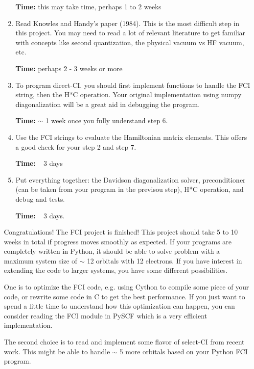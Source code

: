 \documentclass{article}
\begin{document}
\begin{enumerate}
        \textbf{Time:} this may take time, perhaps 1 to 2 weeks

\item  Read Knowles and Handy's paper (1984).  This is the most difficult step in
       this project.  You may need to read a lot of relevant literature to get
       familiar with concepts like second quantization, the physical vacuum vs
       HF vacuum, etc.
       
       \textbf{Time:} perhaps 2 - 3 weeks or more

\item  To program direct-CI, you should first implement functions to handle
       the FCI string, then the H*C operation.  Your original implementation 
       using numpy diagonalization
       will be a great aid in debugging the program.  

       \textbf{Time:} $\sim$ 1 week once you
       fully understand step 6.

\item  Use the FCI strings to evaluate the Hamiltonian matrix elements. This
       offers a good check for your step 2 and step 7.
       
       \textbf{Time:}  ~ 3 days

\item  Put everything together: the Davidson diagonalization solver,
       preconditioner (can be taken from your program in the previsou step), H*C
       operation, and debug and tests.

       \textbf{Time:} ~ 3 days.

\end{enumerate}

Congratulations! The FCI project is finished!  This project
should take 5 to 10 weeks in total if progress moves smoothly as
expected.  If your programs are completely written in Python, it should
be able to solve problem with a maximum system size of $\sim$ 12 orbitals 
with 12 electrons.  If you have
interest in extending the code to larger systems, you have some different
possibilities.

One is to optimize the FCI code, e.g. using Cython to compile some piece
of your code, or rewrite some code in C to get the best
performance.  If you just want to spend a little time to understand how
this optimization can happen, you can consider reading the FCI module in
PySCF which is a very efficient implementation.

The second choice is to read and implement some flavor of select-CI from recent work.
This might be able to handle $\sim$ 5 more orbitals based on your Python FCI
program.
\end{document}
